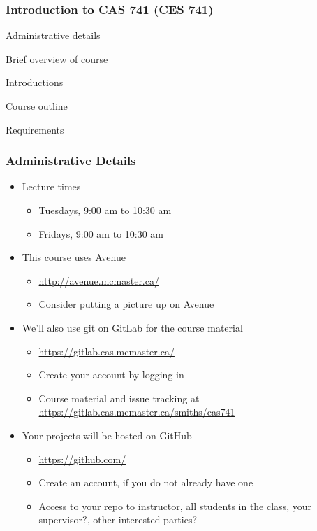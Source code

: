 \documentclass[t,12pt,numbers,fleqn]{beamer}
\begin{document}




\begin{frame}
\frametitle{Introduction to CAS 741 (CES 741)}

\bi
\item Administrative details
\item Brief overview of course
\item Introductions
\item Course outline
\item Requirements
\ei
\end{frame}


\begin{frame}
\frametitle{Administrative Details}

\begin{itemize}

\item Lecture times
\begin{itemize}
\item Tuesdays, 9:00 am to 10:30 am
\item Fridays, 9:00 am to 10:30 am
\end{itemize}
\item This course uses Avenue
\begin{itemize}
\item \url{http://avenue.mcmaster.ca/} 
\item Consider putting a picture up on Avenue
\end{itemize}
\item We'll also use git on GitLab for the course material
\begin{itemize}
\item \url{https://gitlab.cas.mcmaster.ca/}
\item Create your account by logging in
\item Course material and issue tracking at \url{https://gitlab.cas.mcmaster.ca/smiths/cas741}
\end{itemize}
\item Your projects will be hosted on GitHub
\begin{itemize}
\item \url{https://github.com/}
\item Create an account, if you do not already have one
\item Access to your repo to instructor, all students in
  the class, your supervisor?, other interested parties?
\end{itemize}

\end{itemize}

\end{frame}
\end{document}
